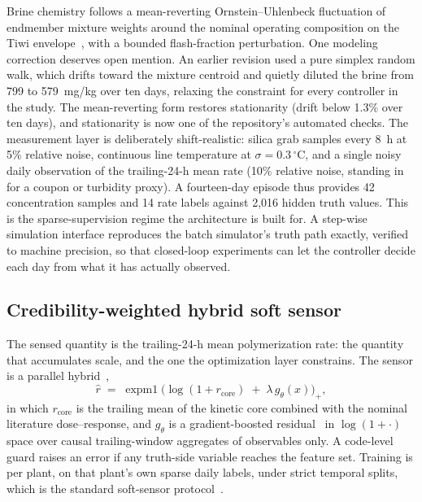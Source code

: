 Brine chemistry follows a mean-reverting Ornstein--Uhlenbeck
fluctuation of endmember mixture weights around the nominal operating
composition on the Tiwi envelope~\citep{sugiaman2004geochemical}, with
a bounded flash-fraction perturbation. One modeling correction deserves
open mention. An earlier revision used a pure simplex random walk,
which drifts toward the mixture centroid and quietly diluted the brine
from 799 to 579~mg/kg over ten days, relaxing the constraint for every
controller in the study. The mean-reverting form restores stationarity
(drift below 1.3\% over ten days), and stationarity is now one of the
repository's automated checks. The measurement layer is deliberately
shift-realistic: silica grab samples every 8~h at 5\% relative noise,
continuous line temperature at $\sigma = 0.3\,^{\circ}$C, and a single
noisy daily observation of the trailing-24-h mean rate (10\% relative
noise, standing in for a coupon or turbidity proxy). A fourteen-day
episode thus provides 42 concentration samples and 14 rate labels
against 2{,}016 hidden truth values. This is the sparse-supervision
regime the architecture is built for. A step-wise simulation interface
reproduces the batch simulator's truth path exactly, verified to
machine precision, so that closed-loop experiments can let the
controller decide each day from what it has actually observed.

\subsection{Credibility-weighted hybrid soft sensor}\label{sec:sensor}

The sensed quantity is the trailing-24-h mean polymerization rate: the
quantity that accumulates scale, and the one the optimization layer
constrains. The sensor is a parallel
hybrid~\citep{thompson1994modeling,vonstosch2014hybrid},
\begin{equation}\label{eq:sensor}
\hat r \;=\; \operatorname{expm1}\!\big(\log(1{+}r_{\mathrm{core}})
\;+\; \lambda\, g_{\theta}(x)\big)_{+},
\end{equation}
in which $r_{\mathrm{core}}$ is the trailing mean of the kinetic core
combined with the nominal literature dose--response, and $g_{\theta}$
is a gradient-boosted residual~\citep{ke2017lightgbm} in
$\log(1{+}\cdot)$ space over causal trailing-window aggregates of
observables only. A code-level guard raises an error if any truth-side
variable reaches the feature set. Training is per plant, on that
plant's own sparse daily labels, under strict temporal splits, which is
the standard soft-sensor protocol~\citep{kadlec2009data}.

